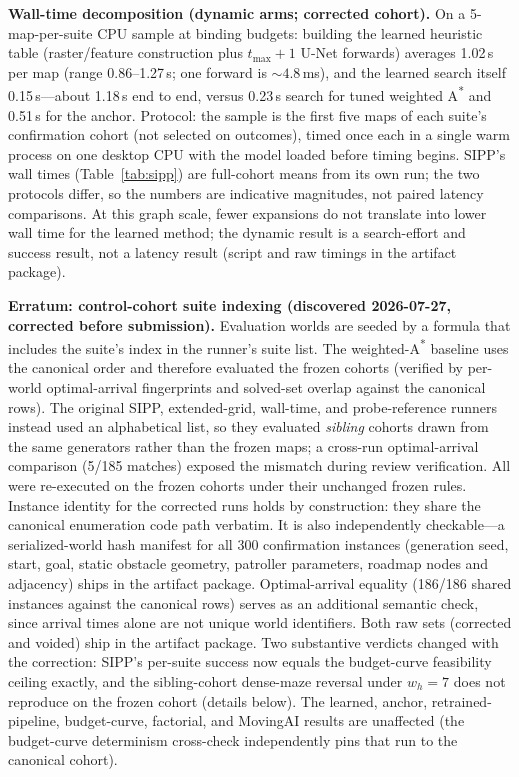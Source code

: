 \documentclass[letterpaper]{article} %
\begin{document}
\textbf{Wall-time decomposition (dynamic arms; corrected cohort).} On a 5-map-per-suite CPU sample at binding budgets: building the learned heuristic table (raster/feature construction plus $t_{\max}{+}1$ U-Net forwards) averages 1.02\,s per map (range 0.86--1.27\,s; one forward is ${\sim}4.8$\,ms), and the learned search itself 0.15\,s---about 1.18\,s end to end, versus 0.23\,s search for tuned weighted A\textsuperscript{*} and 0.51\,s for the anchor. Protocol: the sample is the first five maps of each suite's confirmation cohort (not selected on outcomes), timed once each in a single warm process on one desktop CPU with the model loaded before timing begins. SIPP's wall times (Table~\ref{tab:sipp}) are full-cohort means from its own run; the two protocols differ, so the numbers are indicative magnitudes, not paired latency comparisons. At this graph scale, fewer expansions do not translate into lower wall time for the learned method; the dynamic result is a search-effort and success result, not a latency result (script and raw timings in the artifact package).

\textbf{Erratum: control-cohort suite indexing (discovered 2026-07-27, corrected before submission).} Evaluation worlds are seeded by a formula that includes the suite's index in the runner's suite list. The weighted-A\textsuperscript{*} baseline uses the canonical order and therefore evaluated the frozen cohorts (verified by per-world optimal-arrival fingerprints and solved-set overlap against the canonical rows). The original SIPP, extended-grid, wall-time, and probe-reference runners instead used an alphabetical list, so they evaluated \emph{sibling} cohorts drawn from the same generators rather than the frozen maps; a cross-run optimal-arrival comparison (5/185 matches) exposed the mismatch during review verification. All were re-executed on the frozen cohorts under their unchanged frozen rules. Instance identity for the corrected runs holds by construction: they share the canonical enumeration code path verbatim. It is also independently checkable---a serialized-world hash manifest for all 300 confirmation instances (generation seed, start, goal, static obstacle geometry, patroller parameters, roadmap nodes and adjacency) ships in the artifact package. Optimal-arrival equality (186/186 shared instances against the canonical rows) serves as an additional semantic check, since arrival times alone are not unique world identifiers. Both raw sets (corrected and voided) ship in the artifact package. Two substantive verdicts changed with the correction: SIPP's per-suite success now equals the budget-curve feasibility ceiling exactly, and the sibling-cohort dense-maze reversal under $w_h{=}7$ does not reproduce on the frozen cohort (details below). The learned, anchor, retrained-pipeline, budget-curve, factorial, and MovingAI results are unaffected (the budget-curve determinism cross-check independently pins that run to the canonical cohort).
\end{document}
